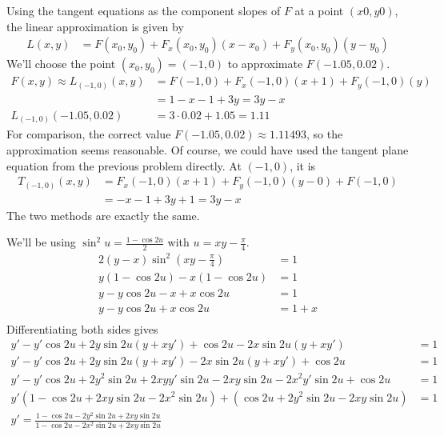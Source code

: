 \documentclass[a4paper,norsk,12pt]{article}
\begin{document}
Using the tangent equations as the component slopes of $F$ at a point $(x0,
y0)$, the linear approximation is given by
\begin{align*}
  L(x,y) &= F(x_0, y_0) + F_x(x_0, y_0)(x-x_0) + F_y(x_0, y_0)(y-y_0)
\end{align*}
We'll choose the point $(x_0, y_0) = (-1, 0)$ to approximate $F(-1.05, 0.02)$.
\begin{align*}
  F(x,y) \approx
  L_{(-1,0)}(x,y)
    &= F(-1,0) + F_x(-1,0)(x+1) + F_y(-1,0)(y) \\
    &= 1 - x - 1 + 3y = 3y-x \\
  L_{(-1,0)}(-1.05, 0.02)
    &= 3\cdot0.02 + 1.05 = 1.11
\end{align*}
For comparison, the correct value $F(-1.05, 0.02) \approx 1.11493$, so the
approximation seems reasonable. Of course, we could have used the tangent plane
equation from the previous problem directly. At $(-1,0)$, it is
\begin{align*}
  T_{(-1,0)}(x,y)
    &= F_x(-1,0)(x+1) + F_y(-1,0)(y-0) + F(-1,0)\\
    &= -x-1 + 3y + 1 = 3y-x
\end{align*}
The two methods are exactly the same.

We'll be using $\sin^2{u} = \frac{1-\cos{2u}}{2}$ with $u=xy-\frac{\pi}{4}$.
\begin{align*}
  2(y-x)\sin^2{(xy-\frac{\pi}{4})} &= 1 \\
  y(1-\cos{2u}) - x(1-\cos{2u}) &= 1 \\
  y - y\cos{2u} - x + x\cos{2u} &= 1 \\
  y - y\cos{2u} + x\cos{2u} &= 1 + x \\
\end{align*}
Differentiating both sides gives
\begin{align*}
  y'-y'\cos{2u}+2y\sin{2u}(y+xy')+\cos{2u}-2x\sin{2u}(y+xy') &= 1 \\
  y'-y'\cos{2u}+2y\sin{2u}(y+xy')-2x\sin{2u}(y+xy')  + \cos{2u} &= 1 \\
  y'-y'\cos{2u}+2y^2\sin{2u}+2xyy'\sin{2u}-2xy\sin{2u} - 2x^2y'\sin{2u} + \cos{2u} &= 1 \\
  y'(1-\cos{2u}+2xy\sin{2u} - 2x^2\sin{2u}) + (\cos{2u} + 2y^2\sin{2u} - 2xy\sin{2u}) &= 1 \\
  y' = \frac{ 1 -\cos{2u} - 2y^2\sin{2u} + 2xy\sin{2u} }
            { 1 -\cos{2u} - 2x^2\sin{2u} + 2xy\sin{2u} }
\end{align*}
\end{document}
